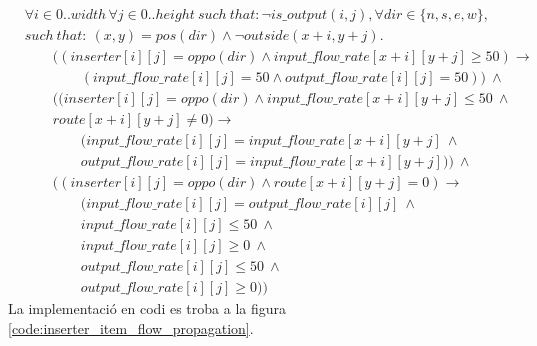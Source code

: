 \begin{align*}
    &\forall i \in 0..width \, \forall j \in 0..height \ such \ that: \neg is\_output(i,j), \forall dir \in \{n, s, e, w\},\\
    &such \ that: \ (x, y)=pos(dir) \land \neg outside(x+i, y+j).\\
    &\qquad ((inserter[i][j]=oppo(dir)\land input\_flow\_rate[x+i][y+j] \geq 50)\rightarrow\\
    &\qquad \qquad (input\_flow\_rate[i][j]=50\land output\_flow\_rate[i][j]=50)) \ \land\\
    &\qquad((inserter[i][j]=oppo(dir)\land input\_flow\_rate[x+i][y+j] \leq 50 \ \land\\
    &\qquad route[x+i][y+j]\neq0)\rightarrow\\
    &\qquad \qquad (input\_flow\_rate[i][j]=input\_flow\_rate[x+i][y+j] \ \land\\
    &\qquad \qquad output\_flow\_rate[i][j]=input\_flow\_rate[x+i][y+j])) \ \land\\
    &\qquad ((inserter[i][j]=oppo(dir)\land route[x+i][y+j]=0)\rightarrow\\
    &\qquad \qquad (input\_flow\_rate[i][j]=output\_flow\_rate[i][j] \ \land\\
    &\qquad \qquad input\_flow\_rate[i][j]\leq50 \ \land\\
    &\qquad \qquad input\_flow\_rate[i][j]\geq0 \ \land\\
    &\qquad \qquad output\_flow\_rate[i][j]\leq50 \ \land\\
    &\qquad \qquad output\_flow\_rate[i][j]\geq0))
\end{align*}
La implementació en codi es troba a la figura \ref{code:inserter_item_flow_propagation}.

